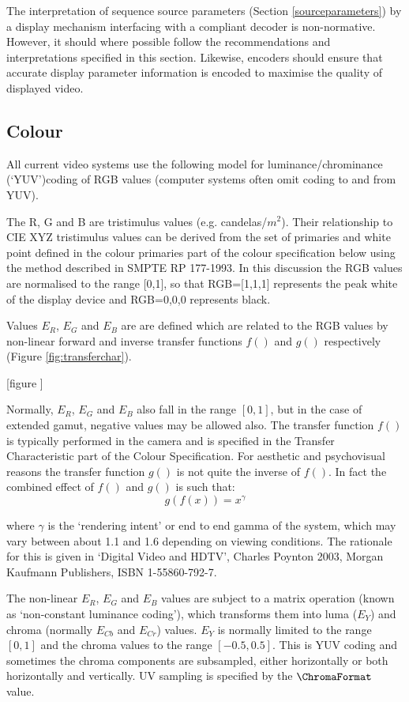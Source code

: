 \label{vidsys}

The interpretation of sequence source parameters (Section \ref{sourceparameters})
by a display mechanism interfacing with a compliant decoder is non-normative. However, it
should where possible follow the recommendations and interpretations
specified in this section. Likewise, encoders should ensure that
accurate display parameter information is encoded to maximise the
quality of displayed video.

\begin{informative*}
\subsection{Colour}
All current video systems use the following model for luminance/chrominance 
(`YUV')coding of RGB values (computer systems often omit coding to and from YUV). 

The R, G and B are tristimulus values (e.g. candelas/$m^2$). Their
relationship to CIE XYZ tristimulus values can be derived from the set
of primaries and white point defined in the colour primaries part of the
colour specification below using the method described in SMPTE RP
177-1993. In this discussion the RGB values are normalised to the range
[0,1], so that RGB=[1,1,1] represents the peak white of the display device
and RGB=0,0,0 represents black.

Values $E_R$, $E_G$ and $E_B$ are are defined which are related to the RGB 
values by non-linear forward and inverse transfer functions $f()$ and $g()$ respectively
(Figure \ref{fig:transferchar}).

[figure \label{fig:transferchar}]

Normally, $E_R$, $E_G$ and $E_B$ also fall in the range $[0,1]$, but in the
case of extended gamut, negative values may be allowed also. The
transfer function $f()$ is typically performed in the camera and
is specified in the Transfer Characteristic part of the
Colour Specification. For aesthetic and psychovisual reasons
the transfer function $g()$ is not quite the inverse of
$f()$. In fact the combined effect of $f()$ and
$g()$ is such that:
\[g(f(x))=x^\gamma\]

where $\gamma$ is the `rendering intent' or end to end gamma of the
system, which may vary between about 1.1 and 1.6 depending on viewing
conditions. The rationale for this is given in `Digital Video and HDTV',
Charles Poynton 2003, Morgan Kaufmann Publishers, ISBN 1-55860-792-7.

The non-linear $E_R$, $E_G$ and $E_B$ values are subject to a matrix operation
(known as `non-constant luminance coding'), which transforms
them into luma ($E_Y$) and chroma (normally $E_{Cb}$ and $E_{Cr}$) values. 
$E_Y$ is normally limited to the 
range $[0,1]$ and the chroma
values to the range $[-0.5, 0.5]$. This is YUV coding and
sometimes the chroma components are subsampled, either horizontally or
both horizontally and vertically. UV sampling is specified by the
$\ChromaFormat$ value. 


\end{informative*}

